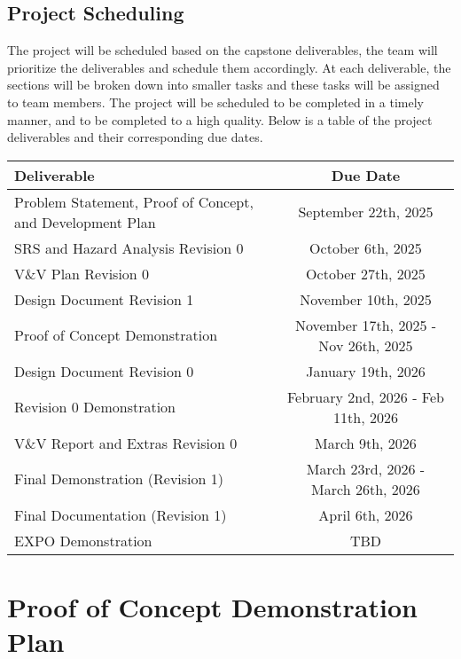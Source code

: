 \documentclass{article}
\begin{document}
\subsection{Project Scheduling}

The project will be scheduled based on the capstone deliverables, the team will prioritize the deliverables and schedule them accordingly. At each deliverable, the sections will be broken down into smaller tasks and these tasks will be assigned to team members. The project will be scheduled to be completed in a timely manner, and to be completed to a high quality. Below is a table of the project deliverables and their corresponding due dates.

\begin{center}
  \begin{tabularx}{\textwidth}{Xc}
    \toprule
    \textbf{Deliverable} & \textbf{Due Date} \\
    \midrule
    Problem Statement, Proof of Concept, and Development Plan &
    September 22th, 2025 \\
    SRS and Hazard Analysis Revision 0 & October 6th, 2025 \\
    V\&V Plan Revision 0 & October 27th, 2025 \\
    Design Document Revision 1 & November 10th, 2025 \\
    Proof of Concept Demonstration & November 17th, 2025 - Nov 26th, 2025 \\
    Design Document Revision 0 & January 19th, 2026 \\
    Revision 0 Demonstration & February 2nd, 2026 - Feb 11th, 2026 \\
    V\&V Report and Extras Revision 0 & March 9th, 2026 \\
    Final Demonstration (Revision 1) & March 23rd, 2026 - March 26th, 2026 \\
    Final Documentation (Revision 1) & April 6th, 2026 \\
    EXPO Demonstration & TBD \\
    \bottomrule
  \end{tabularx}
\end{center}




\section{Proof of Concept Demonstration Plan}

\iffalse
What is the main risk, or risks, for the success of your project?  What will you
demonstrate during your proof of concept demonstration to convince yourself that
you will be able to overcome this risk?
\fi
\end{document}
